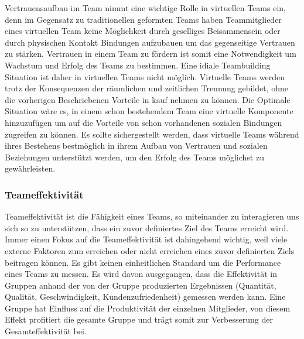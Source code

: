 \documentclass[a4paper,11pt]{article}%
\renewcommand{\\}{\vspace*{0.5\baselineskip} \newline}
\begin{document}
Vertrauensaufbau im Team nimmt eine wichtige Rolle in virtuellen Teams ein, denn im Gegensatz zu traditionellen geformten Teams haben Teammitglieder eines virtuellen Team keine Möglichkeit durch geselliges Beisammensein oder durch physischen Kontakt Bindungen aufzubauen um das gegenseitige Vertrauen zu stärken.\citep{TrustAndTheVirtualOrganisation}  \\
Vertrauen in einem Team zu fördern ist somit eine Notwendigkeit um Wachstum und Erfolg des Teams zu bestimmen. 
\citep{glacel1997teamwork} \\
Eine idiale Teambuilding Situation ist daher in virtuellen Teams nicht möglich. 
Virtuelle Teams werden trotz der Konsequenzen der räumlichen und zeitlichen Trennung gebildet, ohne die vorherigen Beschriebenen Vorteile in kauf nehmen zu können. Die Optimale Situation wäre es, in einem schon bestehendem Team eine virtuelle Komponente hinzuzufügen um auf die Vorteile von schon vorhandenen sozialen Bindungen zugreifen zu können. \citep[p.36-37]{holton2001building}
Es sollte sichergestellt werden, dass virtuelle Teams während ihres Bestehens bestmöglich in ihrem Aufbau von Vertrauen und sozialen Beziehungen unterstützt werden, um den Erfolg des Teams möglichst zu gewährleisten.



	
		\subsubsection{Teameffektivität}

Teameffektivität ist die Fähigkeit eines Teams, so miteinander zu interagieren uns sich so zu unterstützen, dass ein zuvor definiertes Ziel des Teams erreicht wird. Immer einen Fokus auf die Teameffektivität ist dahingehend wichtig, weil viele externe Faktoren zum erreichen oder nicht erreichen eines zuvor definierten Ziels beitragen können.
\citep[p.557]{salas2005there}
	Es gibt keinen einheitlichen Standard um die Performance eines Teams zu messen. Es wird davon ausgegangen, dass die Effektivität in Gruppen anhand der von der Gruppe produzierten Ergebnissen (Quantität, Qualität, Geschwindigkeit, Kundenzufriedenheit) gemessen werden kann. Eine Gruppe hat Einfluss auf die Produktivität der einzelnen Mitglieder, von diesem Effekt profitiert die gesamte Gruppe und trägt somit zur Verbesserung der Gesamteffektivität bei. \citep[p.309]{guzzo1996teams}
	
\end{document}
